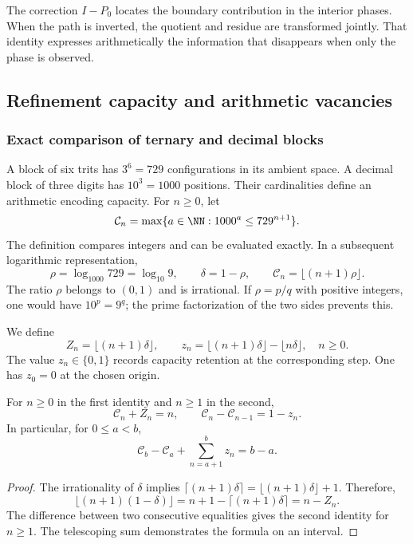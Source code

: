 The correction $I-P_0$ locates the boundary contribution in the interior
phases. When the path is inverted, the quotient and residue are
transformed jointly. That identity expresses arithmetically
the information that disappears when only the phase is observed.

\subsection{Refinement capacity and arithmetic vacancies}

\subsubsection{Exact comparison of ternary and decimal blocks}

A block of six trits has $3^6=729$ configurations in its
ambient space. A decimal block of three digits has $10^3=1000$
positions. Their cardinalities define an arithmetic encoding
capacity. For $n\geq0$, let
\begin{equation}
 \mathcal C_n=\max\{a\in\NN:1000^a\leq729^{n+1}\}.
 \label{eq:cal-capacidad-entera}
\end{equation}
The definition compares integers and can be evaluated exactly. In a
subsequent logarithmic representation,
\[
 \rho=\log_{1000}729=\log_{10}9,\qquad
 \delta=1-\rho,\qquad
 \mathcal C_n=\lfloor(n+1)\rho\rfloor.
\]
The ratio $\rho$ belongs to $(0,1)$ and is irrational. If
$\rho=p/q$ with positive integers, one would have $10^p=9^q$;
the prime factorization of the two sides prevents this.

\begin{definicion}
We define
\[
 Z_n=\lfloor(n+1)\delta\rfloor,\qquad
 z_n=\lfloor(n+1)\delta\rfloor-\lfloor n\delta\rfloor,
 \quad n\geq0.
\]
The value $z_n\in\{0,1\}$ records capacity retention at the
corresponding step. One has $z_0=0$ at the chosen origin.
\end{definicion}

\begin{teorema}
\label{thm:cal-capacidad}
For $n\geq0$ in the first identity and $n\geq1$ in the second,
\begin{equation}
 \mathcal C_n+Z_n=n,
 \qquad \mathcal C_n-\mathcal C_{n-1}=1-z_n.
 \label{eq:cal-capacidad}
\end{equation}
In particular, for $0\leq a<b$,
\[
 \mathcal C_b-\mathcal C_a+\sum_{n=a+1}^{b}z_n=b-a.
\]
\end{teorema}
\begin{proof}
The irrationality of $\delta$ implies
$\lceil(n+1)\delta\rceil=\lfloor(n+1)\delta\rfloor+1$.
Therefore,
\[
 \lfloor(n+1)(1-\delta)\rfloor
 =n+1-\lceil(n+1)\delta\rceil=n-Z_n.
\]
The difference between two consecutive equalities gives the second identity
for $n\geq1$. The telescoping sum demonstrates the formula on an interval.
\end{proof}

